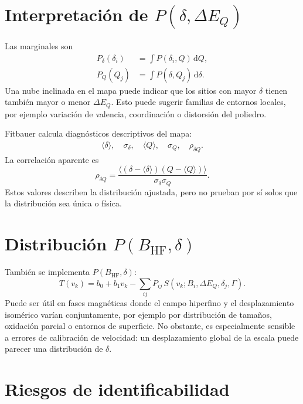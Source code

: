 \documentclass[11pt,a4paper]{article}
\newcommand{\IS}{\delta}
\newcommand{\QS}{\Delta E_Q}
\newcommand{\BHF}{B_{\mathrm{HF}}}
\newcommand{\dd}{\mathrm{d}}
\begin{document}
\section{Interpretación de $P(\IS,\QS)$}

Las marginales son
\begin{align}
  P_{\IS}(\IS_i)&=\int P(\IS_i,Q)\,\dd Q,\\
  P_Q(Q_j)&=\int P(\IS,Q_j)\,\dd\IS.
\end{align}
Una nube inclinada en el mapa puede indicar que los sitios con mayor $\IS$ tienen
también mayor o menor $\QS$. Esto puede sugerir familias de entornos locales,
por ejemplo variación de valencia, coordinación o distorsión del poliedro.

Fitbauer calcula diagnósticos descriptivos del mapa:
\begin{align}
  \langle\IS\rangle,\quad \sigma_{\IS},\quad
  \langle Q\rangle,\quad \sigma_Q,\quad
  \rho_{\IS Q}.
\end{align}
La correlación aparente es
\begin{equation}
  \rho_{\IS Q}=\frac{\langle(\IS-\langle\IS\rangle)(Q-\langle Q\rangle)\rangle}
  {\sigma_{\IS}\sigma_Q}.
\end{equation}
Estos valores describen la distribución ajustada, pero no prueban por sí solos
que la distribución sea única o física.

\section{Distribución $P(\BHF,\IS)$}

También se implementa $P(\BHF,\IS)$:
\begin{equation}
  T(v_k)=b_0+b_1v_k-\sum_{ij}P_{ij}\,
  S(v_k;B_i,\QS,\IS_j,\Gamma).
\end{equation}
Puede ser útil en fases magnéticas donde el campo hiperfino y el desplazamiento
isomérico varían conjuntamente, por ejemplo por distribución de tamaños,
oxidación parcial o entornos de superficie. No obstante, es especialmente
sensible a errores de calibración de velocidad: un desplazamiento global de la
escala puede parecer una distribución de $\IS$.

\section{Riesgos de identificabilidad}
\end{document}
